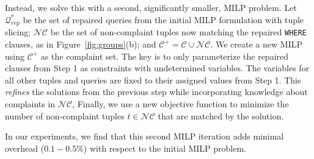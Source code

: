 Instead, we solve this with a second, significantly smaller, MILP problem.   
Let $\mathcal{Q}^*_{rep}$ be the set of repaired queries from the  initial MILP formulation with tuple slicing;
$\mathcal{NC}$ be the set of non-complaint tuples now matching the repaired \texttt{WHERE} clauses, as in Figure~\ref{fig:groups}(b); and $\mathcal{C}^+ = \mathcal{C} \cup \mathcal{NC}$.
We create a new MILP using $\mathcal{C}^+$ as the complaint set.  
The key is to only parameterize the repaired clauses from Step 1 as constraints with undetermined variables.
The variables for all other tuples and queries are fixed to their assigned values from Step 1.
This \emph{refines} the solutions from the previous step while incorporating knowledge about complaints in $\mathcal{NC}$, 
Finally, we use a new objective function to minimize the number of non-complaint tuples 
$t \in \mathcal{NC}$ that are matched by the solution.


In our experiments, we find that this second MILP iteration adds
minimal overhead ($0.1-0.5\%$) with respect to the initial MILP
problem.   





